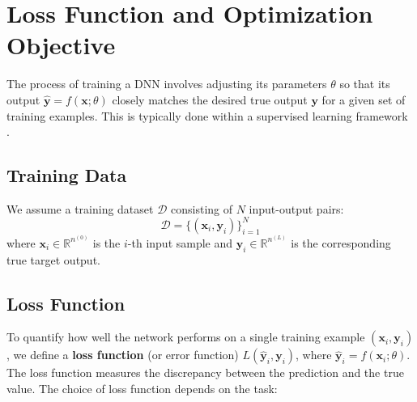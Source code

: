 \documentclass[11pt,twoside,openright]{report}
\begin{document}
\newpage

\section{Loss Function and Optimization Objective}

The process of training a DNN involves adjusting its parameters $\theta$ so that its output $\hat{\mathbf{y}} = f(\mathbf{x}; \theta)$ closely matches the desired true output $\mathbf{y}$ for a given set of training examples. This is typically done within a supervised learning framework \cite{goodfellow2016deep}.

\subsection{Training Data}
We assume a training dataset $\mathcal{D}$ consisting of $N$ input-output pairs:
$$ \mathcal{D} = \{ (\mathbf{x}_i, \mathbf{y}_i) \}_{i=1}^N $$
where $\mathbf{x}_i \in \mathbb{R}^{n^{(0)}}$ is the $i$-th input sample and $\mathbf{y}_i \in \mathbb{R}^{n^{(L)}}$ is the corresponding true target output.

\subsection{Loss Function}
To quantify how well the network performs on a single training example $(\mathbf{x}_i, \mathbf{y}_i)$, we define a \textbf{loss function} (or error function) $L(\hat{\mathbf{y}}_i, \mathbf{y}_i)$, where $\hat{\mathbf{y}}_i = f(\mathbf{x}_i; \theta)$. The loss function measures the discrepancy between the prediction and the true value. The choice of loss function depends on the task:
\end{document}
